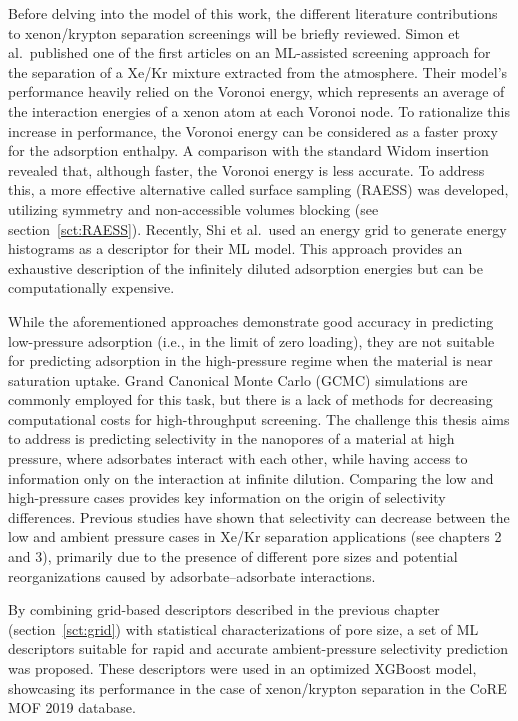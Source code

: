 \documentclass[main]{subfiles}
\begin{document}
Before delving into the model of this work, the different literature contributions to xenon/krypton separation screenings will be briefly reviewed. Simon et al.\ published one of the first articles on an ML-assisted screening approach for the separation of a Xe/Kr mixture extracted from the atmosphere.\autocite{Simon_2015} Their model's performance heavily relied on the Voronoi energy, which represents an average of the interaction energies of a xenon atom at each Voronoi node.\autocite{Rycroft_2009} To rationalize this increase in performance, the Voronoi energy can be considered as a faster proxy for the adsorption enthalpy. A comparison with the standard Widom insertion revealed that, although faster, the Voronoi energy is less accurate. To address this, a more effective alternative called surface sampling (RAESS) was developed, utilizing symmetry and non-accessible volumes blocking (see section~\ref{sct:RAESS}). Recently, Shi et al.\ used an energy grid to generate energy histograms as a descriptor for their ML model. This approach provides an exhaustive description of the infinitely diluted adsorption energies\autocite{Shi_2023} but can be computationally expensive.

While the aforementioned approaches demonstrate good accuracy in predicting low-pressure adsorption (i.e., in the limit of zero loading), they are not suitable for predicting adsorption in the high-pressure regime when the material is near saturation uptake. Grand Canonical Monte Carlo (GCMC) simulations are commonly employed for this task, but there is a lack of methods for decreasing computational costs for high-throughput screening. The challenge this thesis aims to address is predicting selectivity in the nanopores of a material at high pressure, where adsorbates interact with each other, while having access to information only on the interaction at infinite dilution. Comparing the low and high-pressure cases provides key information on the origin of selectivity differences. Previous studies have shown that selectivity can decrease between the low and ambient pressure cases in Xe/Kr separation applications (see chapters 2 and 3), primarily due to the presence of different pore sizes and potential reorganizations caused by adsorbate--adsorbate interactions.

By combining grid-based descriptors described in the previous chapter (section~\ref{sct:grid}) with statistical characterizations of pore size, a set of ML descriptors suitable for rapid and accurate ambient-pressure selectivity prediction was proposed. These descriptors were used in an optimized XGBoost model, showcasing its performance in the case of xenon/krypton separation in the CoRE MOF 2019 database\autocite{Chung_2019}.
\end{document}
